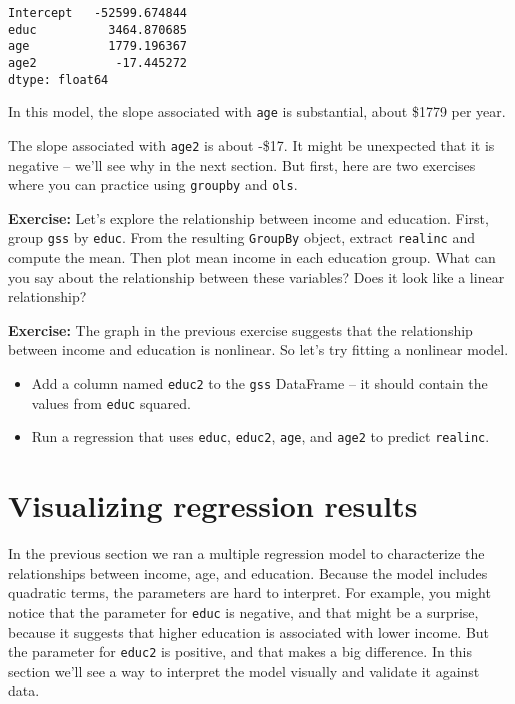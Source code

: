 \begin{lstlisting}[style=output]
Intercept   -52599.674844
educ          3464.870685
age           1779.196367
age2           -17.445272
dtype: float64
\end{lstlisting}

In this model, the slope associated with \passthrough{\lstinline!age!}
is substantial, about \$1779 per year.

The slope associated with \passthrough{\lstinline!age2!} is about -\$17.
It might be unexpected that it is negative -- we'll see why in the next
section. But first, here are two exercises where you can practice using
\passthrough{\lstinline!groupby!} and \passthrough{\lstinline!ols!}.

\textbf{Exercise:} Let's explore the relationship between income and
education. First, group \passthrough{\lstinline!gss!} by
\passthrough{\lstinline!educ!}. From the resulting
\passthrough{\lstinline!GroupBy!} object, extract
\passthrough{\lstinline!realinc!} and compute the mean. Then plot mean
income in each education group. What can you say about the relationship
between these variables? Does it look like a linear relationship?

\textbf{Exercise:} The graph in the previous exercise suggests that the
relationship between income and education is nonlinear. So let's try
fitting a nonlinear model.

\begin{itemize}
\item
  Add a column named \passthrough{\lstinline!educ2!} to the
  \passthrough{\lstinline!gss!} DataFrame -- it should contain the
  values from \passthrough{\lstinline!educ!} squared.
\item
  Run a regression that uses \passthrough{\lstinline!educ!},
  \passthrough{\lstinline!educ2!}, \passthrough{\lstinline!age!}, and
  \passthrough{\lstinline!age2!} to predict
  \passthrough{\lstinline!realinc!}.
\end{itemize}

\section{Visualizing regression
results}\label{visualizing-regression-results}

In the previous section we ran a multiple regression model to
characterize the relationships between income, age, and education.
Because the model includes quadratic terms, the parameters are hard to
interpret. For example, you might notice that the parameter for
\passthrough{\lstinline!educ!} is negative, and that might be a
surprise, because it suggests that higher education is associated with
lower income. But the parameter for \passthrough{\lstinline!educ2!} is
positive, and that makes a big difference. In this section we'll see a
way to interpret the model visually and validate it against data.

